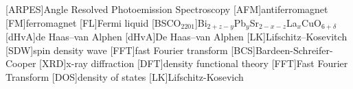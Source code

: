 
[ARPES]{Angle Resolved Photoemission Spectroscopy}
[AFM]{antiferromagnet}
[FM]{ferromagnet}
[FL]{Fermi liquid}
[BSCO$_{2201}$]{Bi$_{2+z-y}$Pb$_{y}$Sr$_{2-x-z}$La$_{x}$CuO$_{6+\delta}$}
[dHvA]{de Haas--van Alphen}
[dHvA]{De Haas--van Alphen}
[LK]{Lifschitz--Kosevitch}
[SDW]{spin density wave}
[FFT]{fast Fourier transform}
[BCS]{Bardeen-Schreifer-Cooper}
[XRD]{x-ray diffraction}
[DFT]{density functional theory}
[FFT]{Fast Fourier Transform}
[DOS]{density of states}
[LK]{Lifschitz-Kosevich}


